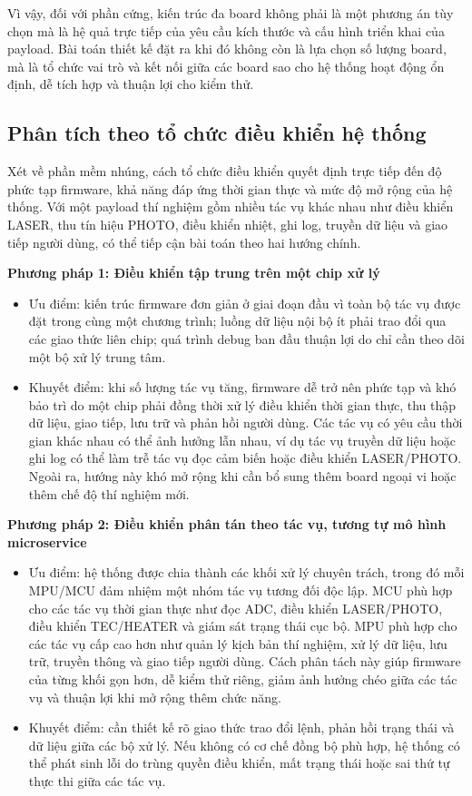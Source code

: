 Vì vậy, đối với phần cứng, kiến trúc đa board không phải là một phương án tùy chọn mà là hệ quả trực tiếp của yêu cầu kích thước và cấu hình triển khai của payload. Bài toán thiết kế đặt ra khi đó không còn là lựa chọn số lượng board, mà là tổ chức vai trò và kết nối giữa các board sao cho hệ thống hoạt động ổn định, dễ tích hợp và thuận lợi cho kiểm thử.

\subsection{Phân tích theo tổ chức điều khiển hệ thống}
\label{subsec:phan_tich_to_chuc_dieu_khien}

Xét về phần mềm nhúng, cách tổ chức điều khiển quyết định trực tiếp đến độ phức tạp firmware, khả năng đáp ứng thời gian thực và mức độ mở rộng của hệ thống. Với một payload thí nghiệm gồm nhiều tác vụ khác nhau như điều khiển LASER, thu tín hiệu PHOTO, điều khiển nhiệt, ghi log, truyền dữ liệu và giao tiếp người dùng, có thể tiếp cận bài toán theo hai hướng chính.

\textbf{Phương pháp 1: Điều khiển tập trung trên một chip xử lý}
\begin{itemize}
    \item Ưu điểm: kiến trúc firmware đơn giản ở giai đoạn đầu vì toàn bộ tác vụ được đặt trong cùng một chương trình; luồng dữ liệu nội bộ ít phải trao đổi qua các giao thức liên chip; quá trình debug ban đầu thuận lợi do chỉ cần theo dõi một bộ xử lý trung tâm.
    \item Khuyết điểm: khi số lượng tác vụ tăng, firmware dễ trở nên phức tạp và khó bảo trì do một chip phải đồng thời xử lý điều khiển thời gian thực, thu thập dữ liệu, giao tiếp, lưu trữ và phản hồi người dùng. Các tác vụ có yêu cầu thời gian khác nhau có thể ảnh hưởng lẫn nhau, ví dụ tác vụ truyền dữ liệu hoặc ghi log có thể làm trễ tác vụ đọc cảm biến hoặc điều khiển LASER/PHOTO. Ngoài ra, hướng này khó mở rộng khi cần bổ sung thêm board ngoại vi hoặc thêm chế độ thí nghiệm mới.
\end{itemize}

\textbf{Phương pháp 2: Điều khiển phân tán theo tác vụ, tương tự mô hình microservice}
\begin{itemize}
    \item Ưu điểm: hệ thống được chia thành các khối xử lý chuyên trách, trong đó mỗi MPU/MCU đảm nhiệm một nhóm tác vụ tương đối độc lập. MCU phù hợp cho các tác vụ thời gian thực như đọc ADC, điều khiển LASER/PHOTO, điều khiển TEC/HEATER và giám sát trạng thái cục bộ. MPU phù hợp cho các tác vụ cấp cao hơn như quản lý kịch bản thí nghiệm, xử lý dữ liệu, lưu trữ, truyền thông và giao tiếp người dùng. Cách phân tách này giúp firmware của từng khối gọn hơn, dễ kiểm thử riêng, giảm ảnh hưởng chéo giữa các tác vụ và thuận lợi khi mở rộng thêm chức năng.
    \item Khuyết điểm: cần thiết kế rõ giao thức trao đổi lệnh, phản hồi trạng thái và dữ liệu giữa các bộ xử lý. Nếu không có cơ chế đồng bộ phù hợp, hệ thống có thể phát sinh lỗi do trùng quyền điều khiển, mất trạng thái hoặc sai thứ tự thực thi giữa các tác vụ.
\end{itemize}

